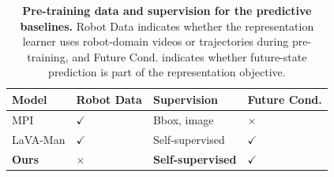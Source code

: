 \begin{table}[!t]
\centering
\caption{\textbf{Pre-training data and supervision for the predictive baselines.} Robot Data indicates whether the representation learner uses robot-domain videos or trajectories during pre-training, and Future Cond. indicates whether future-state prediction is part of the representation objective.}
\begin{tabularx}{\columnwidth}{ l >{\centering\arraybackslash}X >{\centering\arraybackslash}X >{\centering\arraybackslash}X }
\toprule
\textbf{Model} & \textbf{Robot Data} & \textbf{Supervision} & \textbf{Future Cond.} \\
\midrule
MPI        & $\checkmark$ & Bbox, image     & $\times$ \\
LaVA-Man   & $\checkmark$ & Self-supervised & $\checkmark$ \\

\rowcolor[HTML]{DCD5E0} 
\textbf{Ours}  & \textbf{$\times$}   & \textbf{Self-supervised} & \textbf{$\checkmark$} \\
\bottomrule
\end{tabularx}
\label{tab:dif}
\vspace{-3pt}
\end{table}
